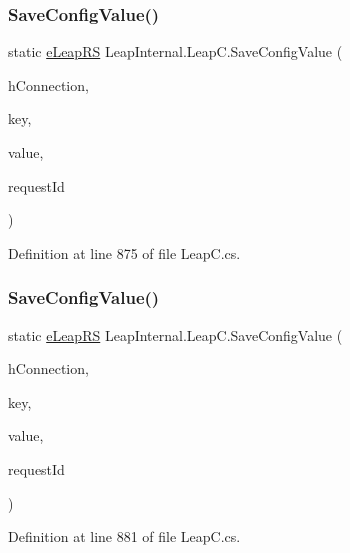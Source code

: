 \subsubsection{\texorpdfstring{SaveConfigValue()}{SaveConfigValue()}\hspace{0.1cm}{\footnotesize\ttfamily [1/4]}}
{\footnotesize\ttfamily static \mbox{\hyperlink{namespace_leap_internal_ae50b07d24c508b84273392b6dcbea1d9}{e\+Leap\+RS}} Leap\+Internal.\+Leap\+C.\+Save\+Config\+Value (\begin{DoxyParamCaption}\item[{Int\+Ptr}]{h\+Connection,  }\item[{string}]{key,  }\item[{bool}]{value,  }\item[{out U\+Int32}]{request\+Id }\end{DoxyParamCaption})\hspace{0.3cm}{\ttfamily [static]}}



Definition at line 875 of file Leap\+C.\+cs.

\mbox{\label{class_leap_internal_1_1_leap_c_a61a4388b720d9d0741a89e16cd93da8b}} 
\subsubsection{\texorpdfstring{SaveConfigValue()}{SaveConfigValue()}\hspace{0.1cm}{\footnotesize\ttfamily [2/4]}}
{\footnotesize\ttfamily static \mbox{\hyperlink{namespace_leap_internal_ae50b07d24c508b84273392b6dcbea1d9}{e\+Leap\+RS}} Leap\+Internal.\+Leap\+C.\+Save\+Config\+Value (\begin{DoxyParamCaption}\item[{Int\+Ptr}]{h\+Connection,  }\item[{string}]{key,  }\item[{Int32}]{value,  }\item[{out U\+Int32}]{request\+Id }\end{DoxyParamCaption})\hspace{0.3cm}{\ttfamily [static]}}



Definition at line 881 of file Leap\+C.\+cs.

\mbox{\label{class_leap_internal_1_1_leap_c_a8638f4fd67973976b28d8c3b3beb4486}} 
